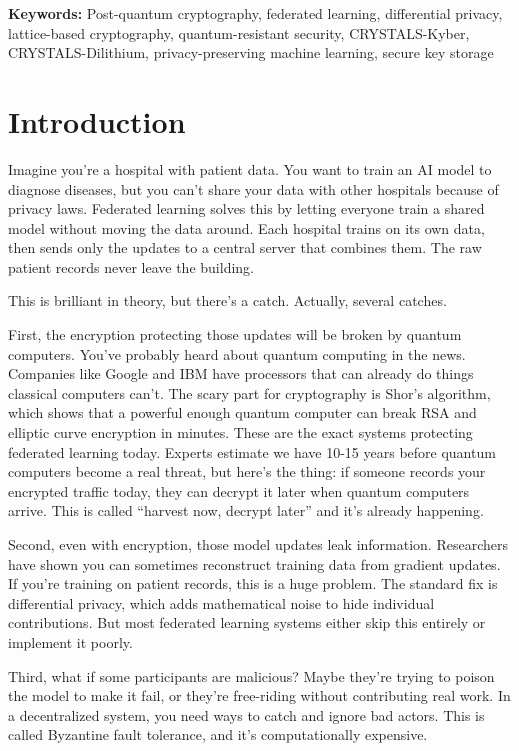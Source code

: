 \documentclass[onecolumn,11pt]{article}
\begin{document}
\noindent\textbf{Keywords:} Post-quantum cryptography, federated learning, differential privacy, lattice-based cryptography, quantum-resistant security, CRYSTALS-Kyber, CRYSTALS-Dilithium, privacy-preserving machine learning, secure key storage

\section{Introduction}
\label{sec:introduction}

Imagine you're a hospital with patient data. You want to train an AI model to diagnose diseases, but you can't share your data with other hospitals because of privacy laws. Federated learning solves this by letting everyone train a shared model without moving the data around. Each hospital trains on its own data, then sends only the updates to a central server that combines them. The raw patient records never leave the building.

This is brilliant in theory, but there's a catch. Actually, several catches.

First, the encryption protecting those updates will be broken by quantum computers. You've probably heard about quantum computing in the news. Companies like Google and IBM have processors that can already do things classical computers can't. The scary part for cryptography is Shor's algorithm, which shows that a powerful enough quantum computer can break RSA and elliptic curve encryption in minutes. These are the exact systems protecting federated learning today. Experts estimate we have 10-15 years before quantum computers become a real threat, but here's the thing: if someone records your encrypted traffic today, they can decrypt it later when quantum computers arrive. This is called ``harvest now, decrypt later'' and it's already happening.

Second, even with encryption, those model updates leak information. Researchers have shown you can sometimes reconstruct training data from gradient updates. If you're training on patient records, this is a huge problem. The standard fix is differential privacy, which adds mathematical noise to hide individual contributions. But most federated learning systems either skip this entirely or implement it poorly.

Third, what if some participants are malicious? Maybe they're trying to poison the model to make it fail, or they're free-riding without contributing real work. In a decentralized system, you need ways to catch and ignore bad actors. This is called Byzantine fault tolerance, and it's computationally expensive.
\end{document}
